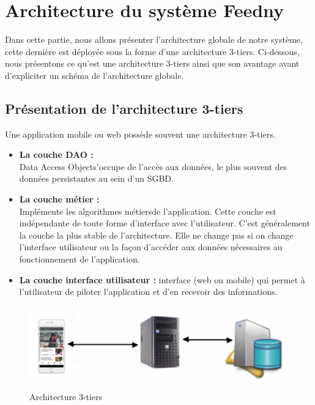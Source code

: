 \section{Architecture du système \textquotedbl Feedny\textquotedbl}
Dans cette partie, nous allons présenter l'architecture globale de notre système, cette dernière est déployée sous la forme d'une architecture 3-tiers. Ci-dessous, nous présentons ce qu'est une architecture 3-tiers ainsi que son avantage avant d'expliciter un schéma de l'architecture globale.

\subsection{Présentation de l'architecture 3-tiers}
Une application mobile ou web possède souvent une architecture 3-tiers.
\begin{itemize}
    \item\textbf{La couche DAO : }\\
    \textquotedbl Data Access Object\textquotedbl  s'occupe de l'accès aux données, le plus souvent des données persistantes au sein d'un SGBD.\\
    \item\textbf{La couche métier : }\\
    Implémente les algorithmes \textquotedbl métiers\textquotedbl  de l'application. Cette couche est indépendante de toute forme d'interface avec l'utilisateur. C'est généralement la couche la plus stable de l'architecture. Elle ne change pas si on change l'interface utilisateur ou la façon d'accéder aux données nécessaires au fonctionnement de l'application.\\
    \item\textbf{La couche interface utilisateur : }interface (web ou mobile) qui permet à l'utilisateur de piloter l'application et d'en recevoir des informations.
\end{itemize}

\begin{figure}[H]
    \centering
    \includegraphics[height=100pt,width=400pt]{img/chapter3/tiers.png}
    \caption{Architecture 3-tiers}
\end{figure}

